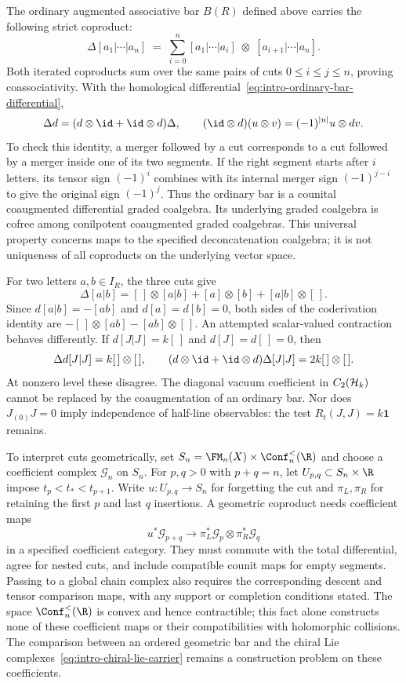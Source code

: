 The ordinary augmented associative bar $B(R)$ defined above
carries the following strict coproduct:
\begin{equation}\label{eq:intro-delta}
\Delta[a_1|\cdots|a_n]
\;=\;
\sum_{i=0}^{n}
[a_1|\cdots|a_i]
\;\otimes\;
[a_{i+1}|\cdots|a_n].
\end{equation}
Both iterated coproducts sum over the same pairs of cuts
$0\leq i\leq j\leq n$, proving coassociativity. With the
homological differential~\eqref{eq:intro-ordinary-bar-differential},
\[
 \Delta d=(d\otimes\id+\id\otimes d)\Delta,
 \qquad (\id\otimes d)(u\otimes v)=(-1)^{|u|}u\otimes dv.
\]
To check this identity, a merger followed by a cut corresponds
to a cut followed by a merger inside one of its two segments.
If the right segment starts after $i$ letters, its tensor sign
$(-1)^i$ combines with its internal merger sign $(-1)^{j-i}$
to give the original sign $(-1)^j$.
Thus the ordinary bar is a counital coaugmented differential
graded coalgebra. Its underlying graded coalgebra is cofree
among conilpotent coaugmented graded coalgebras. This universal
property concerns maps to the specified deconcatenation coalgebra;
it is not uniqueness of all coproducts on the underlying vector space.

For two letters $a,b\in I_R$, the three cuts give
\[
 \Delta[a|b]=[\,]\otimes[a|b]+[a]\otimes[b]
                         +[a|b]\otimes[\,].
\]
Since $d[a|b]=-[ab]$ and $d[a]=d[b]=0$, both sides of the
coderivation identity are
$-[\,]\otimes[ab]-[ab]\otimes[\,]$.
An attempted scalar-valued contraction behaves differently.
If $d[J|J]=k[\,]$ and $d[J]=d[\,]=0$, then
\[
 \Delta d[J|J]=k[\,]\otimes[\,],\qquad
 (d\otimes\id+\id\otimes d)\Delta[J|J]
                 =2k[\,]\otimes[\,].
\]
At nonzero level these disagree. The diagonal vacuum coefficient
in $C_2(\mathcal{H}_k)$ cannot be replaced by the coaugmentation of an
ordinary bar. Nor does $J_{(0)}J=0$ imply independence of
half-line observables: the test $R_t(J,J)=k\mathbf1$ remains.

To interpret cuts geometrically, set
$S_n=\FM_n(X)\times\Conf_n^<(\R)$ and choose a coefficient
complex $\mathscr G_n$ on $S_n$. For $p,q>0$ with $p+q=n$,
let $U_{p,q}\subset S_n\times\R$ impose
$t_p<t_*<t_{p+1}$. Write $u:U_{p,q}\to S_n$ for forgetting
the cut and $\pi_L,\pi_R$ for retaining the first $p$ and last
$q$ insertions. A geometric coproduct needs coefficient maps
\begin{equation}\label{eq:intro-geometric-cut-map}
 u^*\mathscr G_{p+q}\longrightarrow
 \pi_L^*\mathscr G_p\otimes\pi_R^*\mathscr G_q
\end{equation}
in a specified coefficient category. They must commute with the
total differential, agree for nested cuts, and include compatible
counit maps for empty segments. Passing to a global chain complex
also requires the corresponding descent and tensor comparison
maps, with any support or completion conditions stated.
The space $\Conf_n^<(\R)$ is convex and hence contractible;
this fact alone constructs none of these coefficient maps or
their compatibilities with holomorphic collisions.
The comparison between an ordered geometric bar and the chiral
Lie complexes~\eqref{eq:intro-chiral-lie-carrier} remains a
construction problem on these coefficients.

